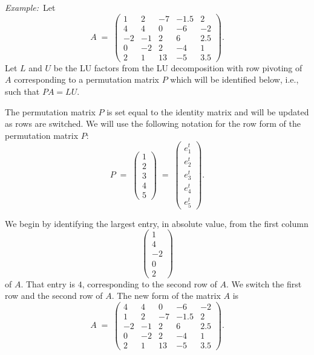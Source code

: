 \par\medskip\noindent\textit{Example:}\ Let
\[
A \;=\; \begin{pmatrix}
1 & 2 & -7 & -1.5 & 2\\
4 & 4 & 0 & -6 & -2\\
-2 & -1 & 2 & 6 & 2.5\\
0 & -2 & 2 & -4 & 1\\
2 & 1 & 13 & -5 & 3.5
\end{pmatrix}.
\]
Let $L$ and $U$ be the LU factors from the LU decomposition with row pivoting of
$A$ corresponding to a permutation matrix $P$ which will be identified below, i.e.,
such that $PA=LU$.

The permutation matrix $P$ is set equal to the identity matrix and will be updated
as rows are switched. We will use the following notation for the row form of the
permutation matrix $P$:
\[
P \;=\; \begin{pmatrix} 1\\ 2\\ 3\\ 4\\ 5\end{pmatrix}
\;=\;
\begin{pmatrix} e_1^t\\ e_2^t\\ e_3^t\\ e_4^t\\ e_5^t\end{pmatrix}.
\]

We begin by identifying the largest entry, in absolute value, from the first
column
\[
\begin{pmatrix} 1\\ 4\\ -2\\ 0\\ 2\end{pmatrix}
\]
of $A$. That entry is $4$, corresponding to the second row of $A$. We switch the
first row and the second row of $A$. The new form of the matrix $A$ is
\begin{equation}
A \;=\; \begin{pmatrix}
4 & 4 & 0 & -6 & -2\\
1 & 2 & -7 & -1.5 & 2\\
-2 & -1 & 2 & 6 & 2.5\\
0 & -2 & 2 & -4 & 1\\
2 & 1 & 13 & -5 & 3.5
\end{pmatrix}.
\end{equation}

